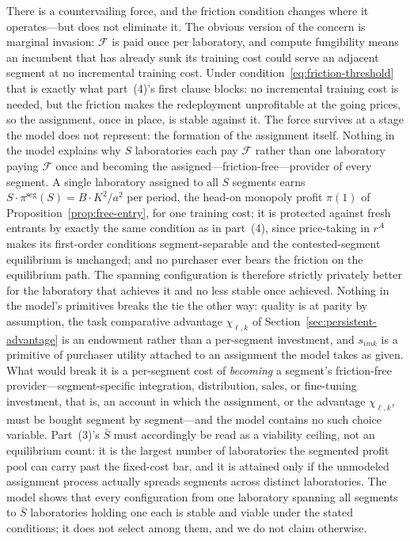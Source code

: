 \documentclass[11pt]{article}
\begin{document}
There is a countervailing force, and the friction condition changes where it operates---but does not eliminate it. The obvious version of the concern is marginal invasion: $\mathcal F$ is paid once per laboratory, and compute fungibility means an incumbent that has already sunk its training cost could serve an adjacent segment at no incremental training cost. Under condition~\eqref{eq:friction-threshold} that is exactly what part~(4)'s first clause blocks: no incremental training cost is needed, but the friction makes the redeployment unprofitable at the going prices, so the assignment, once in place, is stable against it. The force survives at a stage the model does not represent: the formation of the assignment itself. Nothing in the model explains why $S$ laboratories each pay $\mathcal F$ rather than one laboratory paying $\mathcal F$ once and becoming the assigned---friction-free---provider of every segment. A single laboratory assigned to all $S$ segments earns $S\cdot\pi^{\mathrm{seg}}(S)=B\cdot K^{2}/a^{2}$ per period, the head-on monopoly profit $\pi(1)$ of Proposition~\ref{prop:free-entry}, for one training cost; it is protected against fresh entrants by exactly the same condition as in part~(4), since price-taking in $r^{A}$ makes its first-order conditions segment-separable and the contested-segment equilibrium is unchanged; and no purchaser ever bears the friction on the equilibrium path. The spanning configuration is therefore strictly privately better for the laboratory that achieves it and no less stable once achieved. Nothing in the model's primitives breaks the tie the other way: quality is at parity by assumption, the task comparative advantage $\chi_{\ell,k}$ of Section~\ref{sec:persistent-advantage} is an endowment rather than a per-segment investment, and $s_{imk}$ is a primitive of purchaser utility attached to an assignment the model takes as given. What would break it is a per-segment cost of \emph{becoming} a segment's friction-free provider---segment-specific integration, distribution, sales, or fine-tuning investment, that is, an account in which the assignment, or the advantage $\chi_{\ell,k}$, must be bought segment by segment---and the model contains no such choice variable. Part~(3)'s $\bar S$ must accordingly be read as a viability ceiling, not an equilibrium count: it is the largest number of laboratories the segmented profit pool can carry past the fixed-cost bar, and it is attained only if the unmodeled assignment process actually spreads segments across distinct laboratories. The model shows that every configuration from one laboratory spanning all segments to $\bar S$ laboratories holding one each is stable and viable under the stated conditions; it does not select among them, and we do not claim otherwise.
\end{document}
